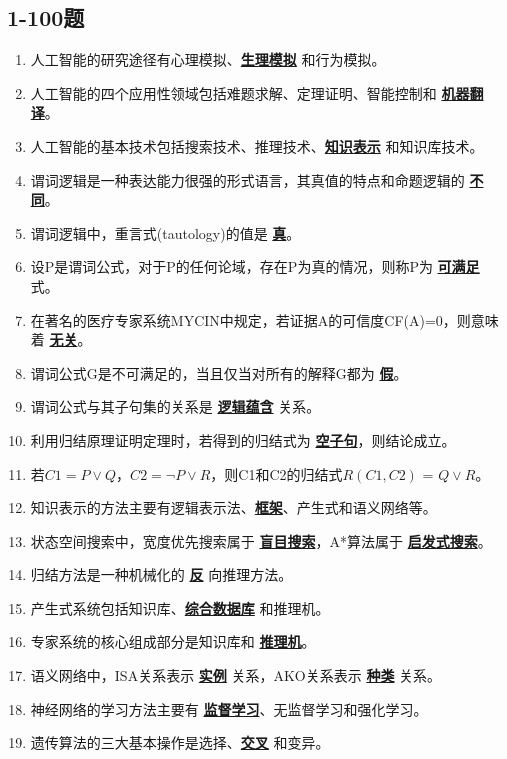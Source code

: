 \documentclass[12pt,a4paper,openany]{ctexbook}
\begin{document}
\subsection{1-100题}
\begin{enumerate}[leftmargin=2em,itemsep=1pt]
\item 人工智能的研究途径有心理模拟、\underline{\textbf{生理模拟}} 和行为模拟。
\item 人工智能的四个应用性领域包括难题求解、定理证明、智能控制和 \underline{\textbf{机器翻译}}。
\item 人工智能的基本技术包括搜索技术、推理技术、\underline{\textbf{知识表示}} 和知识库技术。
\item 谓词逻辑是一种表达能力很强的形式语言，其真值的特点和命题逻辑的 \underline{\textbf{不同}}。
\item 谓词逻辑中，重言式(tautology)的值是 \underline{\textbf{真}}。
\item 设P是谓词公式，对于P的任何论域，存在P为真的情况，则称P为 \underline{\textbf{可满足}} 式。
\item 在著名的医疗专家系统MYCIN中规定，若证据A的可信度CF(A)=0，则意味着 \underline{\textbf{无关}}。
\item 谓词公式G是不可满足的，当且仅当对所有的解释G都为 \underline{\textbf{假}}。
\item 谓词公式与其子句集的关系是 \underline{\textbf{逻辑蕴含}} 关系。
\item 利用归结原理证明定理时，若得到的归结式为 \underline{\textbf{空子句}}，则结论成立。
\item 若$C1=P \lor Q$，$C2=\neg P \lor R$，则C1和C2的归结式$R(C1,C2)$ = \underline{\textbf{$Q \lor R$}}。
\item 知识表示的方法主要有逻辑表示法、\underline{\textbf{框架}}、产生式和语义网络等。
\item 状态空间搜索中，宽度优先搜索属于 \underline{\textbf{盲目搜索}}，A*算法属于 \underline{\textbf{启发式搜索}}。
\item 归结方法是一种机械化的 \underline{\textbf{反}} 向推理方法。
\item 产生式系统包括知识库、\underline{\textbf{综合数据库}} 和推理机。
\item 专家系统的核心组成部分是知识库和 \underline{\textbf{推理机}}。
\item 语义网络中，ISA关系表示 \underline{\textbf{实例}} 关系，AKO关系表示 \underline{\textbf{种类}} 关系。
\item 神经网络的学习方法主要有 \underline{\textbf{监督学习}}、无监督学习和强化学习。
\item 遗传算法的三大基本操作是选择、\underline{\textbf{交叉}} 和变异。

\end{enumerate}
\end{document}
